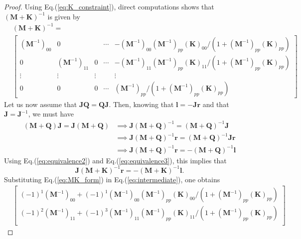 \documentclass[preprint,12pt]{elsarticle}
\begin{document}
\begin{proof}
Using Eq.(\ref{eq:K_constraint}), direct computations shows that $(\mathbf{M}+\mathbf{K})^{-1}$ is given by
\begin{align}
    &(\mathbf{M} + \mathbf{K})^{-1} \nonumber
    =\\
    &\begin{bmatrix}
        (\mathbf{M}^{-1})_{00} &0 & & \cdots& -(\mathbf{M}^{-1})_{00}(\mathbf{M}^{-1})_{pp}(\mathbf{K})_{00}/(1+(\mathbf{M}^{-1})_{pp}(\mathbf{K})_{pp}) \\
        0&(\mathbf{M}^{-1})_{11}&0 & \cdots& -(\mathbf{M}^{-1})_{11}(\mathbf{M}^{-1})_{pp}(\mathbf{K})_{11}/(1+(\mathbf{M}^{-1})_{pp}(\mathbf{K})_{pp}) \\
        \vdots&\vdots&\vdots && \vdots \\
        0&0&0&\cdots&(\mathbf{M}^{-1})_{pp}/(1+(\mathbf{M}^{-1})_{pp} (\mathbf{K})_{pp})
    \end{bmatrix}
    \label{eq:MK_form}
\end{align}
Let us now assume that $\mathbf{J}\mathbf{Q} = \mathbf{Q}\mathbf{J}$. Then, knowing that $\mathbf{l} = -\mathbf{J}\mathbf{r}$ and that $\mathbf{J} = \mathbf{J}^{-1}$, we must have
\begin{align}
    (\mathbf{M} + \mathbf{Q})\mathbf{J} = \mathbf{J}(\mathbf{M}+\mathbf{Q})
    &\implies
    \mathbf{J}(\mathbf{M} + \mathbf{Q})^{-1} = (\mathbf{M} + \mathbf{Q})^{-1}\mathbf{J} \\
    &\implies
    \mathbf{J}(\mathbf{M} + \mathbf{Q})^{-1}\mathbf{r} = (\mathbf{M} + \mathbf{Q})^{-1}\mathbf{J}\mathbf{r} \\
    &\implies
    \mathbf{J}(\mathbf{M} + \mathbf{Q})^{-1}\mathbf{r} = -(\mathbf{M} + \mathbf{Q})^{-1}\mathbf{l}
\end{align}
Using Eq.(\ref{eq:equivalence2}) and Eq.(\ref{eq:equivalence3}), this implies that
\begin{equation}
    \mathbf{J}(\mathbf{M} + \mathbf{K})^{-1}\mathbf{r} = -(\mathbf{M} + \mathbf{K})^{-1}\mathbf{l}.
    \label{eq:intermediate}
\end{equation}
Substituting Eq.(\ref{eq:MK_form}) in Eq.(\ref{eq:intermediate}), one obtains
\begin{align}
    &\begin{bmatrix}
        (-1)^1(\mathbf{M}^{-1})_{00} +(-1)^1(\mathbf{M}^{-1})_{00}(\mathbf{M}^{-1})_{pp}(\mathbf{K})_{00}/(1+(\mathbf{M}^{-1})_{pp}(\mathbf{K})_{pp}) \\
        (-1)^2(\mathbf{M}^{-1})_{11} +(-1)^3(\mathbf{M}^{-1})_{11}(\mathbf{M}^{-1})_{pp}(\mathbf{K})_{11}/(1+(\mathbf{M}^{-1})_{pp}(\mathbf{K})_{pp}) \\

\end{bmatrix}
\end{align}
\end{proof}
\end{document}
